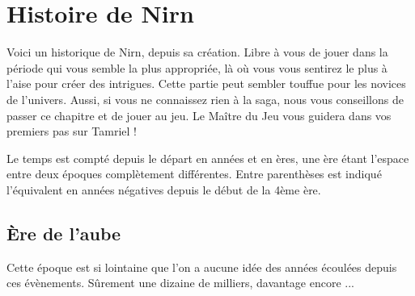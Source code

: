 \chapter{Histoire de Nirn}

Voici un historique de Nirn, depuis sa création. Libre à vous de jouer dans la période qui vous semble la plus appropriée, là où vous vous sentirez le plus à l'aise pour créer des intrigues. Cette partie peut sembler touffue pour les novices de l'univers. Aussi, si vous ne connaissez rien à la saga, nous vous conseillons de passer ce chapitre et de jouer au jeu. Le Maître du Jeu vous guidera dans vos premiers pas sur Tamriel !

Le temps est compté depuis le départ en années et en ères, une ère étant l'espace entre deux époques complètement différentes. Entre parenthèses est indiqué l'équivalent en années négatives depuis le début de la 4ème ère.

\section{Ère de l'aube}

Cette époque est si lointaine que l'on a aucune idée des années écoulées depuis ces évènements. Sûrement une dizaine de milliers, davantage encore ...

